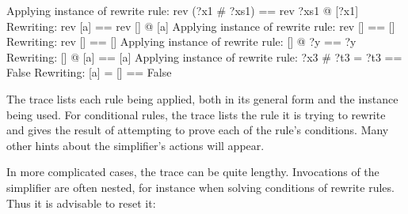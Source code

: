 \begin{isabellebody}
\begin{isamarkuptext}
\begin{ttbox}\makeatother
Applying instance of rewrite rule:
rev (?x1 \# ?xs1) == rev ?xs1 @ [?x1]
Rewriting:
rev [a] == rev [] @ [a]
Applying instance of rewrite rule:
rev [] == []
Rewriting:
rev [] == []
Applying instance of rewrite rule:
[] @ ?y == ?y
Rewriting:
[] @ [a] == [a]
Applying instance of rewrite rule:
?x3 \# ?t3 = ?t3 == False
Rewriting:
[a] = [] == False
\end{ttbox}

The trace lists each rule being applied, both in its general form and the 
instance being used.  For conditional rules, the trace lists the rule
it is trying to rewrite and gives the result of attempting to prove
each of the rule's conditions.  Many other hints about the simplifier's
actions will appear.

In more complicated cases, the trace can be quite lengthy.  Invocations of the
simplifier are often nested, for instance when solving conditions of rewrite
rules.  Thus it is advisable to reset it:%
\end{isamarkuptext}%
\isamarkuptrue%
\isamarkupfalse%
\isamarkupfalse%
\end{isabellebody}%
